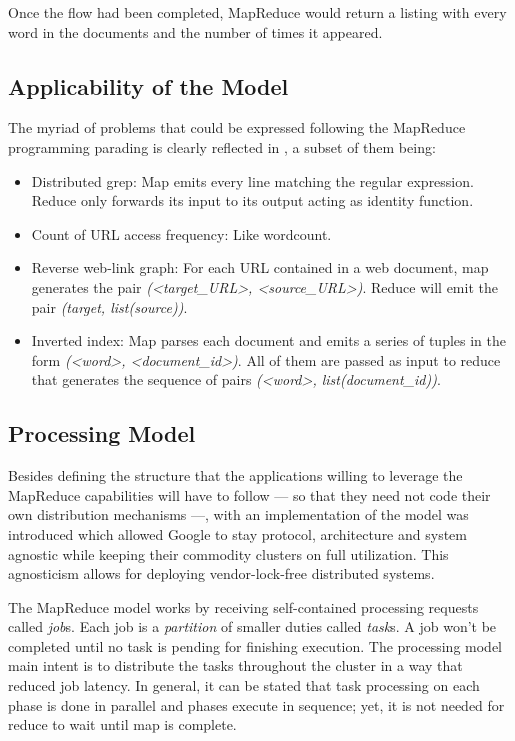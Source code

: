 Once the flow had been completed, MapReduce would return a listing with every word in the documents and the number of times it appeared.

\subsection{Applicability of the Model}\label{subsec:aplicabilidad}

\noindent The myriad of problems that could be expressed following the MapReduce programming parading is clearly reflected in \cite{googlemapreduce}, a subset of them being:

\begin{itemize}
 \item Distributed grep: Map emits every line matching the regular expression. Reduce only forwards its input to its output acting as identity function.
 \item Count of URL access frequency: Like wordcount.
 \item Reverse web-link graph: For each URL contained in a web document, map generates the pair \emph{(<target\_URL>, <source\_URL>)}. Reduce will emit the pair \emph{(target, list(source))}.
 \item Inverted index: Map parses each document and emits a series of tuples in the form \emph{(<word>, <document\_id>)}. All of them are passed as input to reduce that generates the sequence of pairs \emph{(<word>, list(document\_id))}.
\end{itemize}

\subsection{Processing Model}\label{subsec:processingmodel}

\noindent Besides defining the structure that the applications willing to leverage the MapReduce capabilities will have to follow --- so that they need not code their own distribution mechanisms ---, with \cite{googlemapreduce} an implementation of the model was introduced which allowed Google to stay protocol, architecture and system agnostic while keeping their commodity clusters on full utilization. This agnosticism allows for deploying vendor-lock-free distributed systems.

The MapReduce model works by receiving self-contained processing requests called \emph{job}s. Each job is a \emph{partition} of smaller duties called \emph{task}s. A job won't be completed until no task is pending for finishing execution. The processing model main intent is to distribute the tasks throughout the cluster in a way that reduced job latency. In general, it can be stated that task processing on each phase is done in parallel and phases execute in sequence; yet, it is not needed for reduce to wait until map is complete.


